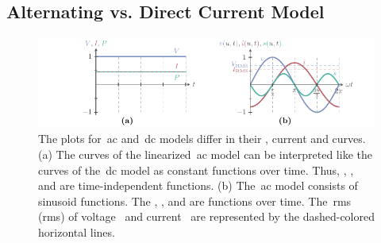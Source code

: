 \subsection{Alternating vs. Direct Current Model}
\label{ch:foundations:sec:power-flow-analyses:subsec:AC-vs-DC-Model}
% 
\begin{figure}
[t!]%
    \includegraphics{foundations/figures/ac-vs-dc.pdf}
    \caption[Difference between the~\gls{ac} and~\gls{dc} model]{The
        plots for~\gls{ac} and~\gls{dc} models differ in their
        , 
        {current} and
         curves. (a) The curves of the
        linearized~\acrshort{ac} model can be interpreted like the curves of
        the~\gls{dc} model as constant functions over time. Thus,
        , 
        ,
        and  
        are time-independent functions. 
        (b) The~\gls{ac} model consists of sinusoid functions. The 
        ,
        ,
        and
         are functions over time. The~\acrlong{rms} (\gls{rms})
        of voltage~ and current~ are
        represented by the dashed-colored horizontal lines.}
    \label{ch:foundations:sec:power-flow-analyses:fig:ac-vs-dc-plots}
\end{figure}

